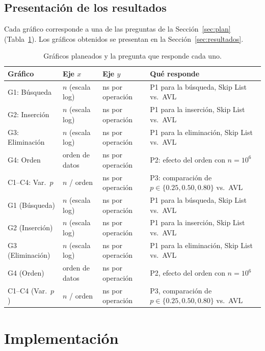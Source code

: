 \documentclass[11pt,a4paper]{article}
\begin{document}
\subsection{Presentación de los resultados}

Cada gráfico corresponde a una de las preguntas de la Sección~\ref{sec:plan}
(Tabla~\ref{tab:graficos}). Los gráficos obtenidos se presentan en la
Sección~\ref{sec:resultados}.

\begin{table}[!htb]
\centering
\renewcommand{\arraystretch}{1.2}
\begin{tabularx}{\textwidth}{l l l X}
\toprule
\textbf{Gráfico} & \textbf{Eje $x$} & \textbf{Eje $y$} & \textbf{Qué responde} \\
\midrule
G1: Búsqueda    & $n$ (escala log) & ns por operación & P1 para la búsqueda, Skip List vs.\ AVL \\
G2: Inserción   & $n$ (escala log) & ns por operación & P1 para la inserción, Skip List vs.\ AVL \\
G3: Eliminación & $n$ (escala log) & ns por operación & P1 para la eliminación, Skip List vs.\ AVL \\
G4: Orden       & orden de datos   & ns por operación & P2: efecto del orden con $n = 10^6$ \\
C1--C4: Var.\ $p$ & $n$ / orden      & ns por operación & P3: comparación de $p \in \{0.25, 0.50, 0.80\}$ vs.\ AVL \\
G1 (Búsqueda)    & $n$ (escala log) & ns por operación & P1 para la búsqueda, Skip List vs.\ AVL \\
G2 (Inserción)   & $n$ (escala log) & ns por operación & P1 para la inserción, Skip List vs.\ AVL \\
G3 (Eliminación) & $n$ (escala log) & ns por operación & P1 para la eliminación, Skip List vs.\ AVL \\
G4 (Orden)       & orden de datos   & ns por operación & P2, efecto del orden con $n = 10^6$ \\
C1--C4 (Var.\ $p$) & $n$ / orden      & ns por operación & P3, comparación de $p \in \{0.25, 0.50, 0.80\}$ vs.\ AVL \\
\bottomrule
\end{tabularx}
\caption{Gráficos planeados y la pregunta que responde cada uno.}
\label{tab:graficos}
\end{table}

\section{Implementación}\label{sec:impl}
\end{document}
